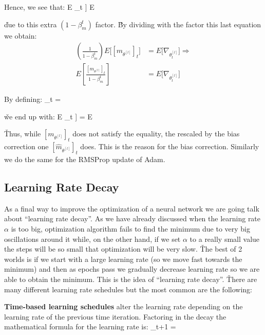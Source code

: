 Hence, we see that:
\bse
E \Big[ [m_{\theta^{[l]}}]_t \Big] \neq E
\ese

\v

due to this extra $(1-\beta_m^t)$ factor. \v

By dividing with the factor this last equation we obtain:
{\setlength{\jot}{10pt}
\begin{align*}
\left(\frac{1}{1-\beta_m^t} \right) E \Big[ [m_{\theta^{[l]}}]_t \Big] 
&= E \Big[\nabla_{\theta^{[l]}_t} \Big] \Rightarrow \\
E \left[ \frac{[m_{\theta^{[l]}}]_t}{1-\beta_m^t} \right] &= E \Big[\nabla_{\theta^{[l]}_t} \Big]
\end{align*}}

By defining:
_t = 
\ese

\v

we end up with:
\bse
E \Big[ [{\hat{m}}_{\theta^{[l]}}]_t \Big] = E 
\ese

\v

Thus, while $ [m_{\theta^{[l]}}]_t$ does not satisfy the equality, the rescaled by the bias correction one 
$[{\hat{m}}_{\theta^{[l]}}]_t$ does. This is the reason for the bias correction. Similarly we do the same for the 
RMSProp update of Adam.

\subsection{Learning Rate Decay}

As a final way to improve the optimization of a neural network we are going talk about ``learning rate decay''. As we
have already discussed when the learning rate $\alpha$ is too big, optimization algorithm fails to find the minimum 
due to very big oscillations around it while, on the other hand, if we set $\alpha$ to a really small value the steps
will be so small that optimization will be very slow. \v

The best of 2 worlds is if we start with a large learning rate (so we move fast towards the minimum) and then as 
epochs pass we gradually decrease learning rate so we are able to obtain the minimum. This is the idea of ``learning 
rate decay''. \v

There are many different learning rate schedules but the most common are the following:
\bit
\item \textbf{Time-based learning schedules} alter the learning rate depending on the learning rate of the previous 
time iteration. Factoring in the decay the mathematical formula for the learning rate is:
\bse
\alpha_{t+1} = 
\ese


